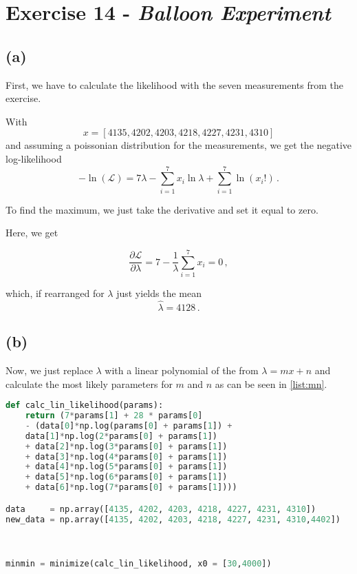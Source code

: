 \section*{Exercise 14 - \textit{Balloon Experiment}}

\subsection*{(a)}

First, we have to calculate the likelihood with the seven
measurements from the exercise.

With
\begin{equation*}
    x = [4135, 4202, 4203, 4218, 4227, 4231, 4310]
\end{equation*}
and assuming a poissonian distribution for the measurements, we get
the negative log-likelihood
\begin{equation*}
    -\ln(\mathscr{L}) = 7\lambda - \sum_{i=1}^7 x_i \ln{\lambda}
    + \sum_{i=1}^7 \ln(x_i!) \,.
\end{equation*}

To find the maximum, we just take the derivative and set it equal to zero.

Here, we get

\begin{equation*}
    \frac{\partial \mathscr{L}}{\partial \lambda} = 7 
    - \frac{1}{\lambda} \sum_{i=1}^7x_i = 0 \,,
\end{equation*}

which, if rearranged for $\lambda$ just yields the mean
\begin{equation*}
    \hat{\lambda} = 4128 \,.
\end{equation*}

\subsection*{(b)}

Now, we just replace $\lambda$ with a linear polynomial of the from
$\lambda = mx + n$ and calculate the most likely parameters for $m$ and $n$ as can be seen in \autoref{list:mn}.

\begin{lstlisting}[language = Python, caption={Calculation of $m, n$.}, label = {list:mn}]
    def calc_lin_likelihood(params):
    return (7*params[1] + 28 * params[0] 
    - (data[0]*np.log(params[0] + params[1]) + 
    data[1]*np.log(2*params[0] + params[1]) 
    + data[2]*np.log(3*params[0] + params[1])
    + data[3]*np.log(4*params[0] + params[1]) 
    + data[4]*np.log(5*params[0] + params[1]) 
    + data[5]*np.log(6*params[0] + params[1]) 
    + data[6]*np.log(7*params[0] + params[1])))

data     = np.array([4135, 4202, 4203, 4218, 4227, 4231, 4310])
new_data = np.array([4135, 4202, 4203, 4218, 4227, 4231, 4310,4402])



minmin = minimize(calc_lin_likelihood, x0 = [30,4000])
\end{lstlisting}

